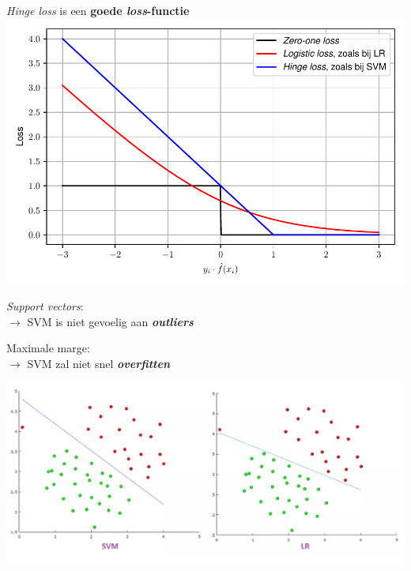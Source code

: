 \documentclass[kulak]{kulakposter}
\begin{document}
	\begin{multicols}{3}
		
		\vfill \null
		
		\begin{center}
		\textit{Hinge loss} is een \textbf{goede \textit{loss}-functie}\\
		\includegraphics[width=.99\columnwidth]{lossfuncties}
		\end{center}
		
		\columnbreak
		
		\vfill \null
		
		\textit{Support vectors}:\\ \(\rightarrow\) SVM is niet gevoelig aan \textit{\textbf{outliers}}
		
		Maximale marge:\\ \(\rightarrow\) SVM zal niet snel \textbf{\textit{overfitten}}\\
		
		\begin{center}
			\includegraphics[width=.99\columnwidth]{outlier}
		\end{center}
		

\end{multicols}
\end{document}
